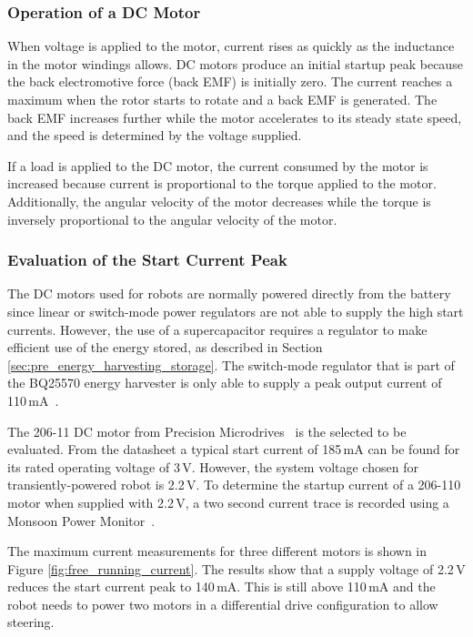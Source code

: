 \subsubsection{Operation of a DC Motor}

When voltage is applied to the motor, current rises as quickly as the inductance in the motor windings allows.
DC motors produce an initial startup peak because the back electromotive force (back EMF) is initially zero.
The current reaches a maximum when the rotor starts to rotate and a back EMF is generated.
The back EMF increases further while the motor accelerates to its steady state speed, and the speed is determined by the voltage supplied.

If a load is applied to the DC motor, the current consumed by the motor is increased because current is proportional to the torque applied to the motor.
Additionally, the angular velocity of the motor decreases while the torque is inversely proportional to the angular velocity of the motor.

\subsubsection{Evaluation of the Start Current Peak}
The DC motors used for robots are normally powered directly from the battery since linear or switch-mode power regulators are not able to supply the high start currents.
However, the use of a supercapacitor requires a regulator to make efficient use of the energy stored, as described in Section \ref{sec:pre_energy_harvesting_storage}.
The switch-mode regulator that is part of the BQ25570 energy harvester is only able to supply a peak output current of 110\,mA~\cite{bq25570_2017}.

The 206-11 DC motor from Precision Microdrives~\cite{gearmotor_206-110_2017} is the selected to be evaluated.
From the datasheet a typical start current of 185\,mA can be found for its rated operating voltage of 3\,V.
However, the system voltage chosen for transiently-powered robot is 2.2\,V.
To determine the startup current of a 206-110 motor when supplied with 2.2\,V, a two second current trace is recorded using a Monsoon Power Monitor~\cite{monsoon_powermonitor_2017}.

The maximum current measurements for three different motors is shown in Figure \ref{fig:free_running_current}.
The results show that a supply voltage of 2.2\,V reduces the start current peak to 140\,mA.
This is still above 110\,mA and the robot needs to power two motors in a differential drive configuration to allow steering.

